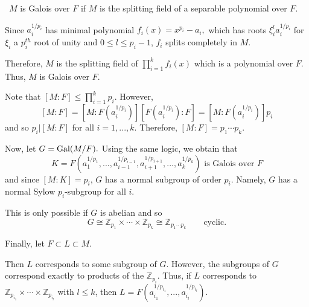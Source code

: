 \documentclass[12pt]{Qual}
\begin{document}
\begin{solution}$\,$
$M$ is Galois over $F$ if $M$ is the splitting field of a separable polynomial over $F.$

Since $a_i^{1/p_i}$ has minimal polynomial $f_i(x)=x^{p_i}-a_i,$ which has roots $\xi_i^la_i^{1/p_i}$ for $\xi_i$ a $p_i^{th}$ root of unity and $0\le l\le p_i-1$, $f_i$ splits completely in $M$.

Therefore, $M$ is the splitting field of $\prod_{i=1}^kf_i(x)$ which is a polynomial over $F$. Thus, $M$ is Galois over $F.$

Note that $[M:F]\le \prod_{i=1}^kp_i$. However, $$[M:F]=[M:F(a_i^{1/p_i})][F(a_i^{1/p_i}):F]=[M:F(a_i^{1/p_i})]p_i$$ and so $p_i|[M:F]$ for all $i=1,...,k$. Therefore, $[M:F]=p_1\cdots p_k.$

Now, let $G=\text{Gal}(M/F).$ Using the same logic, we obtain that $$K=F(a_1^{1/p_1},...,a_{i-1}^{1/p_{i-1}},a_{i+1}^{1/p_{i+1}},...,a_k^{1/p_k})\text{ is Galois over }F$$ and since $[M:K]=p_i$, $G$ has a normal subgroup of order $p_i$. Namely, $G$ has a normal Sylow $p_i$-subgroup for all $i.$

This is only possible if $G$ is abelian and so $$G\cong\mathbb{Z}_{p_1}\times\cdots\times\mathbb{Z}_{p_k}\cong\mathbb{Z}_{p_1\cdots p_k}\qquad\text{cyclic}.$$

Finally, let $F\subset L\subset M.$

Then $L$ corresponds to some subgroup of $G$. However, the subgroups of $G$ correspond exactly to products of the $\mathbb{Z}_{p_i}$. Thus, if $L$ corresponds to $\mathbb{Z}_{p_{i_1}}\times\cdots\times\mathbb{Z}_{p_{i_l}}$ with $l\le k$, then $L=F(a_{i_1}^{1/p_{i_1}},...,a_{i_l}^{1/p_{i_l}})$.
\end{solution}
\newpage
\end{document}
